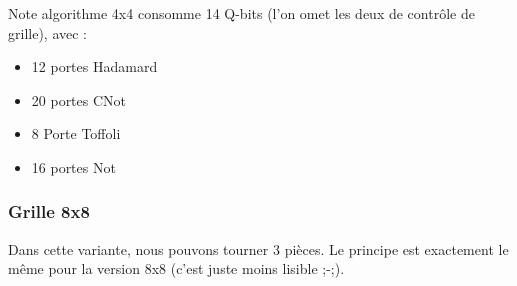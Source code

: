 \documentclass[12pt]{article}
\begin{document}
    Note algorithme 4x4 consomme 14 Q-bits (l'on omet les deux de contrôle de grille), avec :
    \begin{itemize}
        \item 12 portes Hadamard
        \item 20 portes CNot
        \item 8 Porte Toffoli
        \item 16 portes Not
    \end{itemize}

    \subsubsection{Grille 8x8}


    \newpage
    Dans cette variante, nous pouvons tourner 3 pièces.
    Le principe est exactement le même pour la version 8x8 (c'est juste moins lisible ;-;).
\end{document}
